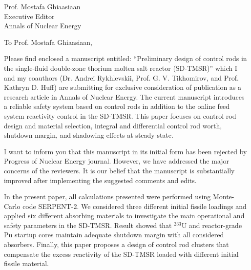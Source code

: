 \documentclass[10.5pt]{letter} %
\newcommand{\RecipientName}{Prof. Mostafa Ghiaasiaan\xspace}
\newcommand{\RecipientAddress}{Executive Editor\\Annals of Nuclear Energy}
\begin{document}
	
	
	
	\begin{letter}{\RecipientName\\
			\RecipientAddress\xspace}
		
		\address{O. Ashraf\\
			oabdelaziz@mephi.ru\\
			osama.ashraf@edu.asu.edu.eg\\
			Institute of Nuc. Physics and Eng.\\
			National Research Nuclear University\\
			Moscow, Russia, 115409}
		
		
		\opening{To \RecipientName,}
		
		Please find enclosed a manuscript entitled: ``Preliminary design of control rods in the single-fluid double-zone thorium molten salt reactor (SD-TMSR)'' which I and my coauthors (Dr. Andrei Rykhlevskii, Prof. G. V. Tikhomirov, and Prof. Kathryn D. Huff) are submitting for exclusive consideration of publication as a research article in Annals of Nuclear Energy. The current manuscript introduces a reliable safety system based on control rods in addition to the online feed system reactivity control in the SD-TMSR. This paper focuses on control rod design and material selection, integral and differential control rod worth, shutdown margin, and shadowing effects at steady-state.
		
		I want to inform you that this manuscript in its initial form has been rejected by Progress of Nuclear Energy journal. However, we have addressed the major concerns of the reviewers. It is our belief that the manuscript is substantially improved after implementing the suggested comments and edits.
		
		In the present paper, all calculations presented were performed using Monte-Carlo code SERPENT-2. We considered three different initial fissile loadings and applied six different absorbing materials to investigate the main operational and safety parameters in the SD-TMSR. Result showed that $^{233}$U and reactor-grade Pu startup cores maintain adequate shutdown margin with all considered absorbers. Finally, this paper proposes a design of control rod clusters that compensate the excess reactivity of the SD-TMSR loaded with different initial fissile material.
		

\end{letter}
\end{document}
